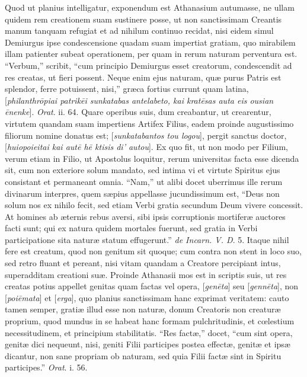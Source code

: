 Quod ut
planius intelligatur, exponendum est Athanasium autumasse, ne ullam
quidem rem creationem suam sustinere posse, ut non sanctissimam
Creantis manum tanquam refugiat et ad nihilum continuo recidat, nisi
eidem simul Demiurgus ipse condescensione quadam suam impertiat
gratiam, quo mirabilem illam patienter subeat operationem, per quam in
rerum naturam perventura est. ``Verbum,'' scribit, ``cum principio
Demiurgus esset creatorum, condescendit ad res creatas, ut fieri
possent. Neque enim ejus naturam, quæ purus Patris est splendor,
ferre potuissent, nisi,'' græca fortius currunt quam latina, [\emph{philanthr\={o}piai
patrik\={e}i sunkatabas antelabeto, kai krat\={e}sas auta eis
ousian \={e}nenke}]. \emph{Orat}. ii. 64. Quare operibus suis,
dum creabantur, ut crearentur, virtutem quandam suam impertiens
Artifex Filius, eadem proinde augustissimo filiorum nomine donatus est;
[\emph{sunkatabantos tou logou}], pergit sanctus doctor, [\emph{huiopoieitai
kai aut\={e} h\={e} ktisis di' autou}]. Ex quo fit, ut non
modo per Filium, verum etiam in Filio, ut Apostolus loquitur, rerum
universitas facta esse dicenda sit, cum non exteriore solum mandato,
sed intima vi et virtute Spiritus ejus consistant et permaneant omnia.
``Nam,'' ut alibi docet uberrimus ille rerum divinarum interpres,
quem sæpius appellasse jucundissimum est, ``Deus non solum nos ex
nihilo fecit, sed etiam Verbi gratia secundum Deum vivere concessit.
At homines ab æternis rebus aversi, sibi ipsis corruptionis mortiferæ auctores facti sunt; qui ex natura quidem mortales fuerunt,
sed gratia in Verbi participatione sita naturæ statum effugerunt.'' \emph{de
Incarn. V. D}. 5. Itaque nihil fere est creatum, quod non genitum
sit quoque; cum contra non stent in loco suo, sed retro fluant et
pereant, nisi vitam quandam a Creatore percipiant intus, superadditam
creationi suæ. Proinde Athanasii mos est in scriptis suis, ut res
creatas potius appellet genitas quam factas vel opera, [\emph{gen\={e}ta}]
seu [\emph{genn\={e}ta}], non [\emph{poi\={e}mata}] et [\emph{erga}],
quo planius sanctissimam hanc exprimat veritatem: cauto tamen semper,
gratiæ illud esse non naturæ, donum Creatoris non creaturæ proprium,
quod mundus in se habeat hanc formam pulchritudinis, et cœlestium
necessitudinem, et principium stabilitatis. ``Res factæ,'' docet, ``cum sint opera, genitæ dici nequeunt, nisi, geniti Filii
participes postea effectæ, genitæ et ipsæ dicantur, non sane
propriam ob naturam, sed quia Filii factæ sint in Spiritu participes.''
\emph{Orat}. i. 56.

